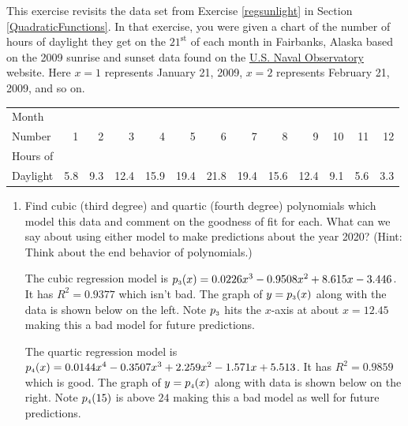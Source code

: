\documentclass{ximera}
\begin{document}
\begin{problem}\label{sunlighthigherorder} 
This exercise revisits the data set from Exercise \ref{regsunlight} in Section \ref{QuadraticFunctions}.  In that exercise, you were given a chart of the number of hours of daylight they get on the $21^{\mbox{st}}$ of each month in Fairbanks, Alaska based on the 2009 sunrise and sunset data found on the  \href{http://aa.usno.navy.mil/data/docs/RS_OneYear.php}{\underline{U.S. Naval Observatory}} website.  Here  $x = 1$ represents January 21, 2009, $x = 2$ represents February 21, 2009, and so on.  


\small

\noindent \begin{tabular}{|l|r|r|r|r|r|r|r|r|r|r|r|r|} \hline
Month  & & & & & & & & & & & & \\
Number & 1 & 2 & 3 & 4 & 5 & 6 & 7 & 8 & 9 & 10 & 11 & 12\\ 
\hline 
Hours of  & & & & & & & & & & & & \\
Daylight & 5.8 & 9.3 & 12.4 & 15.9 & 19.4 & 21.8 & 19.4 & 15.6 & 12.4 & 9.1 & 5.6 & 3.3 \\ \hline
\end{tabular}

\begin{enumerate}

\item Find cubic (third degree) and quartic (fourth degree) polynomials which model this data and comment on the goodness of fit for each.  What can we say about using either model to make predictions about the year 2020?  (Hint: Think about the end behavior of polynomials.)  

\begin{solution}
    The cubic regression model is $p_{\mbox{\tiny $3$}}(x) = 0.0226x^{3} - 0.9508x^{2} + 8.615x - 3.446$.  It has $R^{2} = 0.9377$ which isn't bad.  The graph of $y = p_{\mbox{\tiny $3$}}(x)$ along with the data is shown below on the left.  Note $p_{\mbox{\tiny $3$}}$ hits the $x$-axis at about $x = 12.45$ making this a bad model for future predictions. 
\end{solution}

\begin{solution}
    The quartic regression model is $p_{\mbox{\tiny $4$}}(x) = 0.0144x^{4} - 0.3507x^{3} + 2.259x^{2} - 1.571x + 5.513$.  It has $R^{2} = 0.9859$ which is good.  The graph of $y = p_{\mbox{\tiny $4$}}(x)$  along with data is shown below on the right.  Note  $p_{\mbox{\tiny $4$}}(15)$ is above $24$ making this a bad model as well for future predictions.  
\end{solution}


\end{enumerate}
\end{problem}
\end{document}
